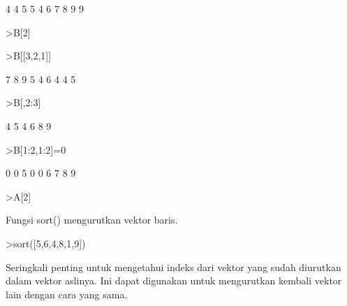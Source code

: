 \documentclass[12pt,arial,letterpaper]{book}
\begin{document}
\begin{eulercomment}
\begin{eulercomment}
\begin{eulercomment}
\begin{eulercomment}
\begin{eulercomment}
\begin{eulercomment}
\begin{eulercomment}
\begin{eulercomment}
\begin{euleroutput}
              4             4             5 
              5             4             6 
              7             8             9 
  9
\end{euleroutput}
\begin{eulerprompt}
>B[2]
\end{eulerprompt}
\begin{euleroutput}
  [5,  4,  6]
\end{euleroutput}
\begin{eulerprompt}
>B[[3,2,1]]
\end{eulerprompt}
\begin{euleroutput}
              7             8             9 
              5             4             6 
              4             4             5 
\end{euleroutput}
\begin{eulerprompt}
>B[,2:3]
\end{eulerprompt}
\begin{euleroutput}
              4             5 
              4             6 
              8             9 
\end{euleroutput}
\begin{eulerprompt}
>B[1:2,1:2]=0
\end{eulerprompt}
\begin{euleroutput}
              0             0             5 
              0             0             6 
              7             8             9 
\end{euleroutput}
\begin{eulerprompt}
>A[2]
\end{eulerprompt}
\begin{euleroutput}
  [0,  0,  6]
\end{euleroutput}
\begin{eulercomment}
Fungsi sort() mengurutkan vektor baris.
\end{eulercomment}
\begin{eulerprompt}
>sort([5,6,4,8,1,9])
\end{eulerprompt}
\begin{euleroutput}
  [1,  4,  5,  6,  8,  9]
\end{euleroutput}
\begin{eulercomment}
Seringkali penting untuk mengetahui indeks dari vektor yang sudah
diurutkan dalam vektor aslinya. Ini dapat digunakan untuk mengurutkan
kembali vektor lain dengan cara yang sama.


\end{eulercomment}
\end{eulercomment}
\end{eulercomment}
\end{eulercomment}
\end{eulercomment}
\end{eulercomment}
\end{eulercomment}
\end{eulercomment}
\end{eulercomment}
\end{document}
